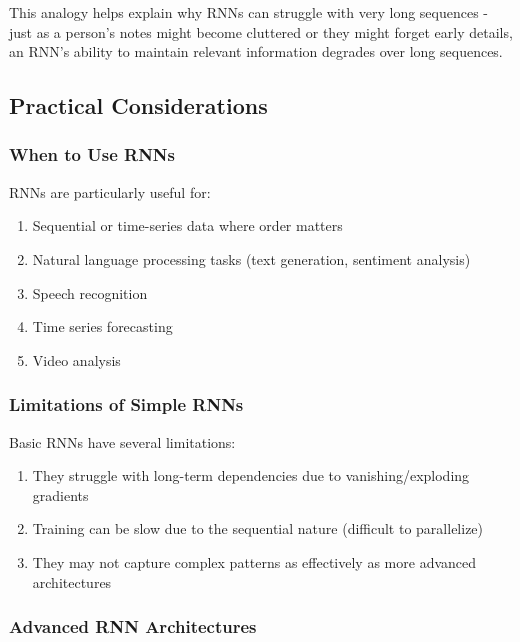 \documentclass[
  letterpaper,
  DIV=11,
  numbers=noendperiod]{scrreprt}
\providecommand{\tightlist}{%
  \setlength{\itemsep}{0pt}\setlength{\parskip}{0pt}}\usepackage{longtable,booktabs,array}
\begin{document}
This analogy helps explain why RNNs can struggle with very long
sequences - just as a person's notes might become cluttered or they
might forget early details, an RNN's ability to maintain relevant
information degrades over long sequences.

\subsection{Practical Considerations}\label{practical-considerations-1}

\subsubsection{When to Use RNNs}\label{when-to-use-rnns}

RNNs are particularly useful for:

\begin{enumerate}
\def\labelenumi{\arabic{enumi}.}
\tightlist
\item
  Sequential or time-series data where order matters
\item
  Natural language processing tasks (text generation, sentiment
  analysis)
\item
  Speech recognition
\item
  Time series forecasting
\item
  Video analysis
\end{enumerate}

\subsubsection{Limitations of Simple
RNNs}\label{limitations-of-simple-rnns}

Basic RNNs have several limitations:

\begin{enumerate}
\def\labelenumi{\arabic{enumi}.}
\tightlist
\item
  They struggle with long-term dependencies due to vanishing/exploding
  gradients
\item
  Training can be slow due to the sequential nature (difficult to
  parallelize)
\item
  They may not capture complex patterns as effectively as more advanced
  architectures
\end{enumerate}

\subsubsection{Advanced RNN
Architectures}\label{advanced-rnn-architectures}
\end{document}
